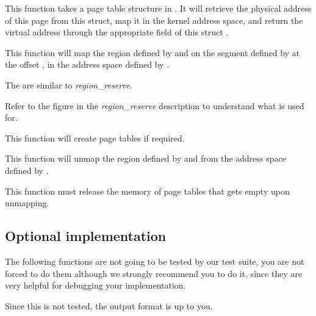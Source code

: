 {
  This function takes a page table structure in . It will retrieve
  the physical address of this page from this struct, map it in the kernel address
  space, and return the virtual address through the appropriate field of this
  struct .
}

{
  This function will map the region defined by  and 
  on the segment defined by  at the offset , in the
  address space defined by .
  
  \-

  The  are similar to \emph{region\_reserve}.

  \-

  Refer to the figure in the \emph{region\_reserve} description to understand what
   is used for.

  \-

  This function will create page tables if required.
}

{
  This function will unmap the region defined by  and 
  from the address space defined by .

  \-

  This function must release the memory of page tables that gets empty upon unmapping.
}

\subsection*{Optional implementation}

The following functions are not going to be tested by our test suite, you are
not forced to do them although we strongly recommend you to do it, since they
are very helpful for debugging your implementation.

\-

Since this is not tested, the output format is up to you.

